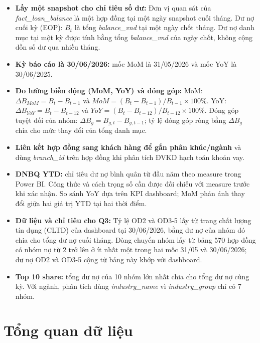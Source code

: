 \documentclass[12pt]{eDA_conquer2026}
\begin{document}
\begin{itemize}[label=$\bullet$, leftmargin=0.8cm, itemsep=0.2em]
    \item \textbf{Lấy một snapshot cho chỉ tiêu số dư:} Đơn vị quan sát của \textit{fact\_loan\_balance} là một hợp đồng tại một ngày snapshot cuối tháng. Dư nợ cuối kỳ (EOP): $B_t$ là tổng \textit{balance\_vnd} tại một ngày chốt tháng. Dư nợ danh mục tại một kỳ được tính bằng tổng \textit{balance\_vnd} của ngày chốt, không cộng dồn số dư qua nhiều tháng.
    
    \item \textbf{Kỳ báo cáo là 30/06/2026:} mốc MoM là 31/05/2026 và mốc YoY là 30/06/2025. 
    
    \item \textbf{Đo lường biến động (MoM, YoY) và đóng góp:} MoM: $\Delta B_{MoM}=B_t-B_{t-1}$ và $MoM=(B_t-B_{t-1})/B_{t-1}\times100\%$. YoY: $\Delta B_{YoY}=B_t-B_{t-12}$ và $YoY=(B_t-B_{t-12})/B_{t-12}\times100\%$. Đóng góp tuyệt đối của nhóm: $\Delta B_g=B_{g,t}-B_{g,t-1}$; tỷ lệ đóng góp ròng bằng $\Delta B_g$ chia cho mức thay đổi của tổng danh mục.
    
    \item \textbf{Liên kết hợp đồng sang khách hàng để gắn phân khúc/ngành} và dùng \textit{branch\_id} trên hợp đồng khi phân tích ĐVKD hạch toán khoản vay.
    
    \item \textbf{DNBQ YTD:} chỉ tiêu dư nợ bình quân từ đầu năm theo measure trong Power BI. Công thức và cách trọng số cần được đối chiếu với measure trước khi xác nhận. So sánh YoY dựa trên KPI dashboard; MoM phản ánh thay đổi giữa hai giá trị YTD tại hai thời điểm.
    
    \item \textbf{Dữ liệu và chỉ tiêu cho Q3:} Tỷ lệ OD2 và OD3-5 lấy từ trang chất lượng tín dụng (CLTD) của dashboard tại 30/06/2026, bằng dư nợ của nhóm đó chia cho tổng dư nợ cuối tháng. Dòng chuyển nhóm lấy từ bảng 570 hợp đồng có nhóm nợ từ 2 trở lên ở ít nhất một trong hai mốc 31/05 và 30/06/2026; dư nợ OD2 và OD3-5 cộng từ bảng này khớp với dashboard.

    \item \textbf{Top 10 share:} tổng dư nợ của 10 nhóm lớn nhất chia cho tổng dư nợ cùng kỳ. Với ngành, phân tích dùng \textit{industry\_name} vì \textit{industry\_group} chỉ có 7 nhóm.
\end{itemize}

\section{Tổng quan dữ liệu}
\end{document}
